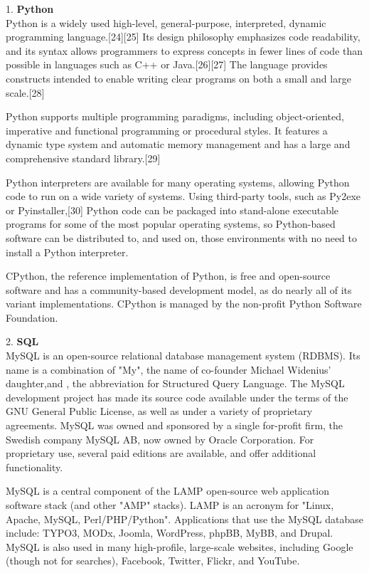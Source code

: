 \documentclass[11pt]{report}
\begin{document}
\begin{flushleft}
1. \textbf{Python}\\
Python is a widely used high-level, general-purpose, interpreted, dynamic programming language.[24][25] Its design philosophy emphasizes code readability, and its syntax allows programmers to express concepts in fewer lines of code than possible in languages such as C++ or Java.[26][27] The language provides constructs intended to enable writing clear programs on both a small and large scale.[28]

Python supports multiple programming paradigms, including object-oriented, imperative and functional programming or procedural styles. It features a dynamic type system and automatic memory management and has a large and comprehensive standard library.[29]

Python interpreters are available for many operating systems, allowing Python code to run on a wide variety of systems. Using third-party tools, such as Py2exe or Pyinstaller,[30] Python code can be packaged into stand-alone executable programs for some of the most popular operating systems, so Python-based software can be distributed to, and used on, those environments with no need to install a Python interpreter.

CPython, the reference implementation of Python, is free and open-source software and has a community-based development model, as do nearly all of its variant implementations. CPython is managed by the non-profit Python Software Foundation.
\end{flushleft}

\begin{flushleft}
2. \textbf{SQL}\\
MySQL is an open-source relational database management system (RDBMS). Its name is a combination of "My", the name of co-founder Michael Widenius' daughter,and , the abbreviation for Structured Query Language. The MySQL development project has made its source code available under the terms of the GNU General Public License, as well as under a variety of proprietary agreements. MySQL was owned and sponsored by a single for-profit firm, the Swedish company MySQL AB, now owned by Oracle Corporation. For proprietary use, several paid editions are available, and offer additional functionality.

MySQL is a central component of the LAMP open-source web application software stack (and other "AMP" stacks). LAMP is an acronym for "Linux, Apache, MySQL, Perl/PHP/Python". Applications that use the MySQL database include: TYPO3, MODx, Joomla, WordPress, phpBB, MyBB, and Drupal. MySQL is also used in many high-profile, large-scale websites, including Google (though not for searches), Facebook, Twitter, Flickr, and YouTube.

\end{flushleft}
\newpage
\end{document}
